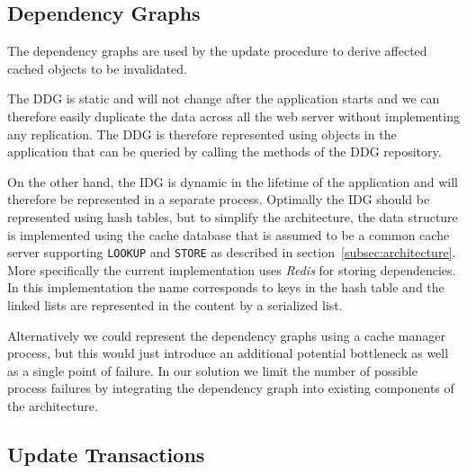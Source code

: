 \subsection{Dependency Graphs}
\label{subsec:dependency-graphs}

The dependency graphs are used by the update procedure to derive affected cached objects to be invalidated.

The DDG is static and will not change after the application starts and we can therefore easily duplicate the data across all the web server without implementing any replication. The DDG is therefore represented using objects in the application that can be queried by calling the methods of the DDG repository.

On the other hand, the IDG is dynamic in the lifetime of the application and will therefore be represented in a separate process. Optimally the IDG should be represented using hash tables, but to simplify the architecture, the data structure is implemented using the cache database that is assumed to be a common cache server supporting \verb$LOOKUP$ and \verb$STORE$ as described in section~\ref{subsec:architecture}. More specifically the current implementation uses \emph{Redis} for storing dependencies. In this implementation the name corresponds to keys in the hash table and the linked lists are represented in the content by a serialized list.

Alternatively we could represent the dependency graphs using a cache manager process, but this would just introduce an additional potential bottleneck as well as a single point of failure. In our solution we limit the number of possible process failures by integrating the dependency graph into existing components of the architecture.


\subsection{Update Transactions}
\label{subsec:update-transactions}

